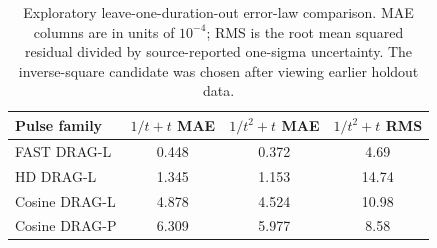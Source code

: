 \begin{table}[t]
\centering\caption{Exploratory leave-one-duration-out error-law comparison. MAE columns are in units of $10^{-4}$; RMS is the root mean squared residual divided by source-reported one-sigma uncertainty. The inverse-square candidate was chosen after viewing earlier holdout data.}\label{tab:law_comparison}
\begin{tabular}{lccc}\hline
Pulse family & $1/t+t$ MAE & $1/t^2+t$ MAE & $1/t^2+t$ RMS\\\hline
FAST DRAG-L & 0.448 & 0.372 & 4.69\\
HD DRAG-L & 1.345 & 1.153 & 14.74\\
Cosine DRAG-L & 4.878 & 4.524 & 10.98\\
Cosine DRAG-P & 6.309 & 5.977 & 8.58\\
\hline\end{tabular}
\end{table}
